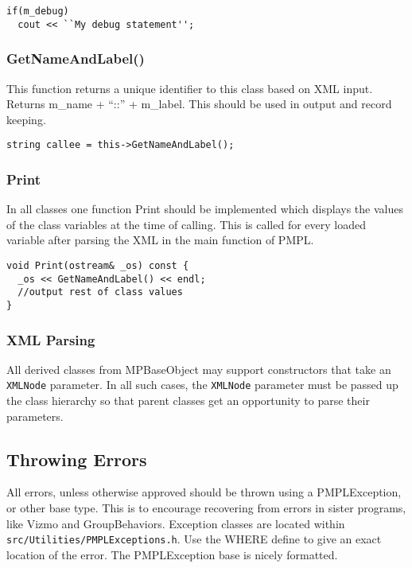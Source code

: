 \documentclass[12pt]{article}
\begin{document}
\begin{lstlisting}
if(m_debug)
  cout << ``My debug statement'';
\end{lstlisting}

\subsubsection{GetNameAndLabel()}

This function returns a unique identifier to this class based on XML input.
Returns m\_name + ``::'' + m\_label. This should be used in output and record
keeping.

\begin{lstlisting}
string callee = this->GetNameAndLabel();
\end{lstlisting}

\subsubsection{Print}

In all classes one function Print should be implemented which displays the
values of the class variables at the time of calling. This is called for every
loaded variable after parsing the XML in the main function of PMPL.

\begin{lstlisting}
void Print(ostream& _os) const {
  _os << GetNameAndLabel() << endl;
  //output rest of class values
}
\end{lstlisting}

\subsubsection{XML Parsing}

All derived classes from MPBaseObject may support constructors that take an
\texttt{XMLNode} parameter. In all such cases, the \texttt{XMLNode} parameter
must be passed up the class hierarchy so that parent classes get an opportunity
to parse their parameters.

\subsection{Throwing Errors}

All errors, unless otherwise approved should be thrown using a PMPLException, or
other base type. This is to encourage recovering from errors in sister programs,
like Vizmo and GroupBehaviors. Exception classes are located within
\texttt{src/Utilities/PMPLExceptions.h}. Use the WHERE define to give an exact
location of the error. The PMPLException base is nicely formatted.
\end{document}
